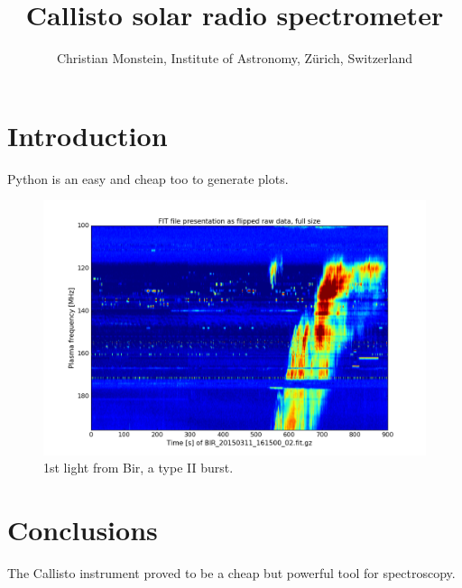 \documentclass[a4paper,11pt]{article}
\begin{document}
\author{Christian Monstein, Institute of Astronomy, Z\"{u}rich, Switzerland}
\title{Callisto solar radio spectrometer}
\maketitle
\section{Introduction}
Python is an easy and cheap too to generate plots.
\begin{figure} %
\centering
   \includegraphics[natwidth=1200bp,natheight=800bp, scale=0.5]{2D_flipud.png}%
\caption{1st light from Bir, a type II burst.\label{1stlight}}
\end{figure}
\section{Conclusions}
The Callisto instrument proved to be a cheap but powerful tool for
spectroscopy.
\end{document}
